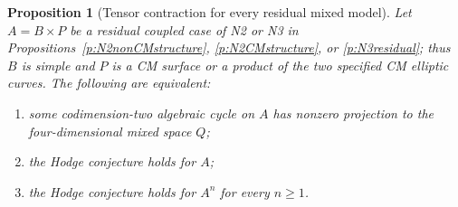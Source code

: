 \documentclass[10pt,reqno]{article}
\theoremstyle{emphasizedplain}
\newtheorem{proposition}[theorem]{Proposition}
\theoremstyle{emphasizeddefinition}
\theoremstyle{emphasizeddefinition}
\begin{document}
\begin{proposition}[Tensor contraction for every residual mixed model]
\label{p:mixed-allpowers}
Let $A=B\times P$ be a residual coupled case of N2 or N3 in
Propositions~\ref{p:N2nonCMstructure}, \ref{p:N2CMstructure}, or
\ref{p:N3residual}; thus $B$ is simple and $P$ is a CM surface or a
product of the two specified CM elliptic curves. The following are
equivalent:
\begin{enumerate}
\item some codimension-two algebraic cycle on $A$ has nonzero
projection to the four-dimensional mixed space $Q$;
\item the Hodge conjecture holds for $A$;
\item the Hodge conjecture holds for $A^n$ for every $n\ge1$.
\end{enumerate}
\end{proposition}
\end{document}
